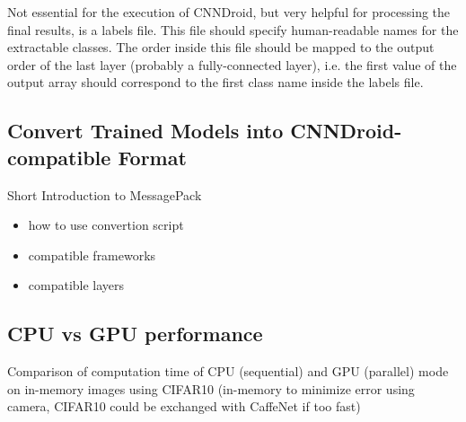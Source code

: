 Not essential for the execution of CNNDroid, but very helpful for processing the final results, is a labels file. This file should specify human-readable names for the extractable classes. The order inside this file should be mapped to the output order of the last layer (probably a fully-connected layer), i.e. the first value of the output array should correspond to the first class name inside the labels file.

\subsection{Convert Trained Models into CNNDroid-compatible Format}
Short Introduction to MessagePack
\begin{itemize}
    \item{how to use convertion script}
    \item{compatible frameworks}
    \item{compatible layers}
\end{itemize}

\subsection{CPU vs GPU performance}
Comparison of computation time of CPU (sequential) and GPU (parallel) mode on in-memory images using CIFAR10 (in-memory to minimize error using camera, CIFAR10 could be exchanged with CaffeNet if too fast)